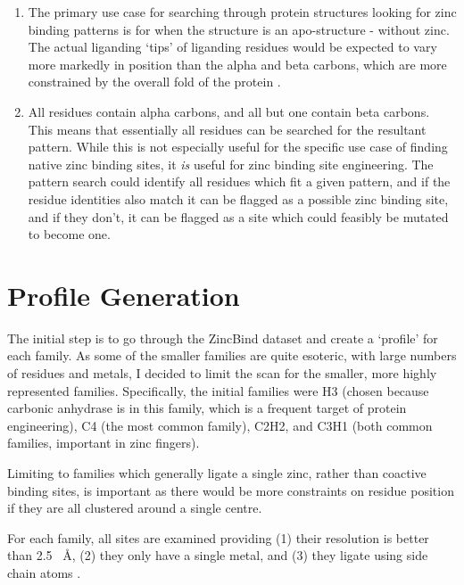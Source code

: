 \begin{enumerate}
   \item The primary use case for searching through protein structures looking for zinc binding patterns is for when the structure is an apo-structure - without zinc. The actual liganding `tips' of liganding residues would be expected to vary more markedly in position than the alpha and beta carbons, which are more constrained by the overall fold of the protein .
   \item All residues contain alpha carbons, and all but one contain beta carbons. This means that essentially all residues can be searched for the resultant pattern. While this is not especially useful for the specific use case of finding native zinc binding sites, it \emph{is} useful for zinc binding site engineering. The pattern search could identify all residues which fit a given pattern, and if the residue identities also match it can be flagged as a possible zinc binding site, and if they don't, it can be flagged as a site which could feasibly be mutated to become one.
\end{enumerate}

\section{Profile Generation}

The initial step is to go through the ZincBind dataset and create a `profile' for each family. As some of the smaller families are quite esoteric, with large numbers of residues and metals, I decided to limit the scan for the smaller, more highly represented families. Specifically, the initial families were H3 (chosen because carbonic anhydrase is in this family, which is a frequent target of protein engineering), C4 (the most common family), C2H2, and C3H1 (both common families, important in zinc fingers).

Limiting to families which generally ligate a single zinc, rather than coactive binding sites, is important as there would be more constraints on residue position if they are all clustered around a single centre.

For each family, all sites are examined providing (1) their resolution is better than 2.5 ~{\AA}, (2) they only have a single metal, and (3) they ligate using side chain atoms .